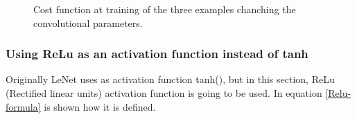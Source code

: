 \begin{figure}[htb]
    \centering

    \caption{Cost function at training of the three examples chanching the convolutional parameters.} \label{fig:LENETLFW_Cost}
\end{figure}



\subsubsection{Using ReLu as an activation function instead of tanh}
Originally LeNet uses as activation function tanh(), but in this section, ReLu (Rectified linear units) activation function is going to be used. In equation \ref{Relu-formula} is shown how it is defined.  \\

